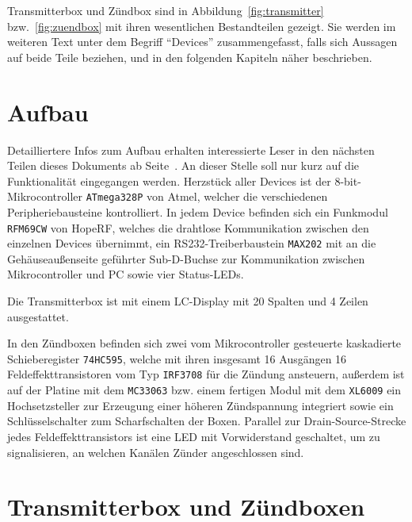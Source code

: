 \documentclass[pdftex, parskip, numbers=noenddot, toc=listof]{scrbook}
\begin{document}
	Transmitterbox und Zündbox sind in Abbildung~\ref{fig:transmitter} bzw.~\ref{fig:zuendbox} mit ihren wesentlichen Bestandteilen gezeigt. Sie werden im weiteren Text unter dem Begriff \enquote{Devices} zusammengefasst, falls sich Aussagen auf beide Teile beziehen, und in den folgenden Kapiteln näher beschrieben.

	\section{Aufbau}

	Detailliertere Infos zum Aufbau erhalten interessierte Leser in den nächsten Teilen dieses Dokuments ab Seite~\pageref{part:dokumentation}. An dieser Stelle soll nur kurz auf die Funktionalität eingegangen werden. Herzstück aller Devices ist der 8-bit-Mikrocontroller \texttt{ATmega328P} von Atmel, welcher die verschiedenen Peripheriebausteine kontrolliert. In jedem Device befinden sich ein Funkmodul \texttt{RFM69CW} von HopeRF, welches die drahtlose Kommunikation zwischen den einzelnen Devices übernimmt, ein RS232-Treiberbaustein \texttt{MAX202} mit an die Gehäuseaußenseite geführter Sub-D-Buchse zur Kommunikation zwischen Mikrocontroller und PC sowie vier Status-LEDs.

	Die Transmitterbox ist mit einem LC-Display mit 20 Spalten und 4 Zeilen ausgestattet.

	In den Zündboxen befinden sich zwei vom Mikrocontroller gesteuerte kaskadierte Schieberegister \texttt{74HC595}, welche mit ihren insgesamt 16 Ausgängen 16 Feldeffekttransistoren vom Typ \texttt{IRF3708} für die Zündung ansteuern, außerdem ist auf der Platine mit dem \texttt{MC33063} bzw. einem fertigen Modul mit dem \texttt{XL6009} ein Hochsetzsteller zur Erzeugung einer höheren Zündspannung integriert sowie ein Schlüsselschalter zum Scharfschalten der Boxen. Parallel zur Drain-Source-Strecke jedes Feldeffekttransistors ist eine LED mit Vorwiderstand geschaltet, um zu signalisieren, an welchen Kanälen Zünder angeschlossen sind.



	\section{Transmitterbox und Zündboxen}
\end{document}

